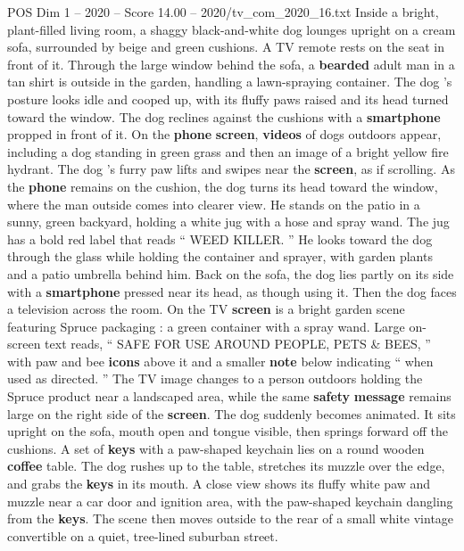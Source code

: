 \begin{textsample}{POS Dim 1 – 2020 – Score 14.00 – 2020/tv\_com\_2020\_16.txt}  \label{ex:f1_pos_020}
Inside a bright, plant-filled living room, a shaggy black-and-white dog lounges upright on a cream sofa, surrounded by beige and green cushions.
A TV remote rests on the seat in front of it.
Through the large window behind the sofa, a \textbf{bearded} adult man in a tan shirt is outside in the garden, handling a lawn-spraying container.
The dog ’s posture looks idle and cooped up, with its fluffy paws raised and its head turned toward the window.
The dog reclines against the cushions with a \textbf{smartphone} propped in front of it.
On the \textbf{phone} \textbf{screen}, \textbf{videos} of dogs outdoors appear, including a dog standing in green grass and then an image of a bright yellow fire hydrant.
The dog ’s furry paw lifts and swipes near the \textbf{screen}, as if scrolling.
As the \textbf{phone} remains on the cushion, the dog turns its head toward the window, where the man outside comes into clearer view.
He stands on the patio in a sunny, green backyard, holding a white jug with a hose and spray wand.
The jug has a bold red label that reads “ WEED KILLER. ” He looks toward the dog through the glass while holding the container and sprayer, with garden plants and a patio umbrella behind him.
Back on the sofa, the dog lies partly on its side with a \textbf{smartphone} pressed near its head, as though using it.
Then the dog faces a television across the room.
On the TV \textbf{screen} is a bright garden scene featuring Spruce packaging : a green container with a spray wand.
Large on-screen text reads, “ SAFE FOR USE AROUND PEOPLE, PETS \& BEES, ” with paw and bee \textbf{icons} above it and a smaller \textbf{note} below indicating “ when used as directed. ” The TV image changes to a person outdoors holding the Spruce product near a landscaped area, while the same \textbf{safety} \textbf{message} remains large on the right side of the \textbf{screen}.
The dog suddenly becomes animated.
It sits upright on the sofa, mouth open and tongue visible, then springs forward off the cushions.
A set of \textbf{keys} with a paw-shaped keychain lies on a round wooden \textbf{coffee} table.
The dog rushes up to the table, stretches its muzzle over the edge, and grabs the \textbf{keys} in its mouth.
A close view shows its fluffy white paw and muzzle near a car door and ignition area, with the paw-shaped keychain dangling from the \textbf{keys}.
The scene then moves outside to the rear of a small white vintage convertible on a quiet, tree-lined suburban street.

\end{textsample}
